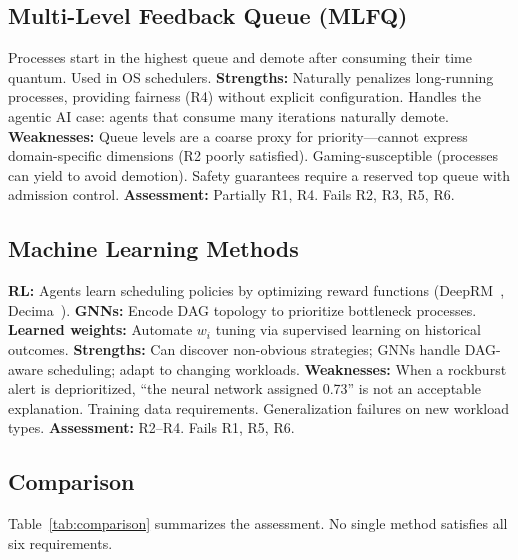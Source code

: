 \documentclass[conference]{IEEEtran}
\begin{document}
\subsection{Multi-Level Feedback Queue (MLFQ)}

Processes start in the highest queue and demote after consuming their time quantum. Used in OS schedulers. \textbf{Strengths:} Naturally penalizes long-running processes, providing fairness (R4) without explicit configuration. Handles the agentic AI case: agents that consume many iterations naturally demote. \textbf{Weaknesses:} Queue levels are a coarse proxy for priority---cannot express domain-specific dimensions (R2 poorly satisfied). Gaming-susceptible (processes can yield to avoid demotion). Safety guarantees require a reserved top queue with admission control. \textbf{Assessment:} Partially R1, R4. Fails R2, R3, R5, R6.

\subsection{Machine Learning Methods}

\textbf{RL:} Agents learn scheduling policies by optimizing reward functions (DeepRM~\cite{mao2016resource}, Decima~\cite{mao2019learning}). \textbf{GNNs:} Encode DAG topology to prioritize bottleneck processes. \textbf{Learned weights:} Automate $w_i$ tuning via supervised learning on historical outcomes. \textbf{Strengths:} Can discover non-obvious strategies; GNNs handle DAG-aware scheduling; adapt to changing workloads. \textbf{Weaknesses:} When a rockburst alert is deprioritized, ``the neural network assigned 0.73'' is not an acceptable explanation. Training data requirements. Generalization failures on new workload types. \textbf{Assessment:} R2--R4. Fails R1, R5, R6.

\subsection{Comparison}

Table~\ref{tab:comparison} summarizes the assessment. No single method satisfies all six requirements.
\end{document}
